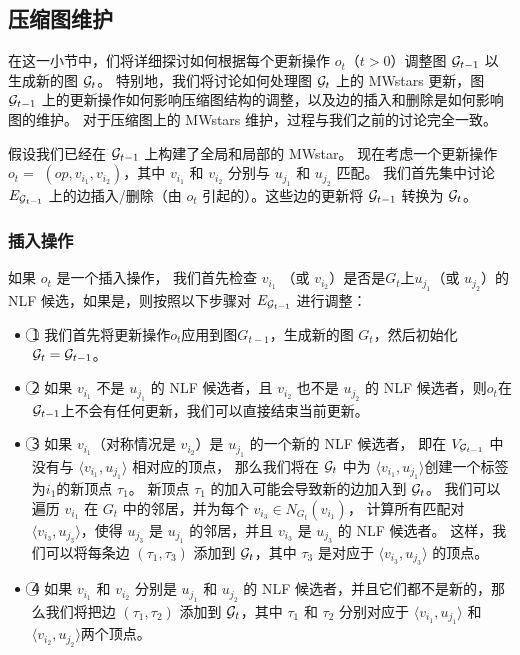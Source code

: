\subsection{压缩图维护}
在这一小节中，们将详细探讨如何根据每个更新操作 $o_t$（$t>0$）调整图 $\mathcal{G}_{t-1}$ 以生成新的图 $\mathcal{G}_t$。
特别地，我们将讨论如何处理图 $\mathcal{G}_t$ 上的 MWstars 更新，图 $\mathcal{G}_{t-1}$ 上的更新操作如何影响压缩图结构的调整，以及边的插入和删除是如何影响图的维护。
对于压缩图上的 MWstars 维护，过程与我们之前的讨论完全一致。

假设我们已经在 $\mathcal{G}_{t-1}$ 上构建了全局和局部的 MWstar。
现在考虑一个更新操作 $o_t=$ $(op, v_{i_1}, v_{i_2})$，其中 $v_{i_1}$ 和 $v_{i_2}$ 分别与 $u_{j_1}$ 和 $u_{j_2}$ 匹配。
%
我们首先集中讨论 $E_{\mathcal{G}_{t-1}}$ 上的边插入/删除（由 $o_t$ 引起的）。这些边的更新将 $\mathcal{G}_{t-1}$ 转换为 $\mathcal{G}_t$。

\subsubsection{插入操作}
如果 $o_t$ 是一个插入操作，
我们首先检查 $v_{i_1}$ （或 $v_{i_2}$）是否是$G_t$上$u_{j_1}$（或 $u_{j_2}$）的 NLF 候选，如果是，则按照以下步骤对 $E_{\mathcal{G}_{t-1}}$ 进行调整：
\begin{itemize}
\item \textcircled{1} 我们首先将更新操作$o_t$应用到图$G_{t-1}$，生成新的图 $G_t$，然后初始化 $\mathcal{G}_t = \mathcal{G}_{t-1}$。
\item \textcircled{2} 如果 $v_{i_1}$ 不是 $u_{j_1}$ 的 NLF 候选者，且 $v_{i_2}$ 也不是 $u_{j_2}$ 的 NLF 候选者，则$o_t$在$\mathcal{G}_{t-1}$上不会有任何更新，我们可以直接结束当前更新。
\item \textcircled{3} 如果 $v_{i_1}$（对称情况是 $v_{i_2}$）是 $u_{j_1}$ 的一个新的 NLF 候选者，
即在 $V_{\mathcal{G}_{t-1}}$ 中没有与 $\langle v_{i_1}, u_{j_1} \rangle$ 相对应的顶点，
那么我们将在 $\mathcal{G}_t$ 中为 $\langle v_{i_1}, u_{j_1} \rangle$创建一个标签为$i_1$的新顶点 $\tau_1$。
新顶点 $\tau_1$ 的加入可能会导致新的边加入到 $\mathcal{G}_t$。
我们可以遍历 $v_{i_1}$ 在 $G_t$ 中的邻居，并为每个 $v_{i_3}\in N_{G_t}(v_{i_1})$，
计算所有匹配对 $\langle v_{i_3}, u_{j_3} \rangle$，使得 $u_{j_3}$ 是 $u_{j_1}$ 的邻居，并且 $v_{i_3}$ 是 $u_{j_3}$ 的 NLF 候选者。
这样，我们可以将每条边 $(\tau_1, \tau_3)$ 添加到 $\mathcal{G}_t$，其中 $\tau_3$ 是对应于 $\langle v_{i_3}, u_{j_3} \rangle$ 的顶点。
\item \textcircled{4} 如果 $v_{i_1}$ 和 $v_{i_2}$ 分别是 $u_{j_1}$ 和 $u_{j_2}$ 的 NLF 候选者，并且它们都不是新的，那么我们将把边 $(\tau_1, \tau_2)$ 添加到 $\mathcal{G}_t$，其中 $\tau_1$ 和 $\tau_2$ 分别对应于 $\langle v_{i_1}, u_{j_1} \rangle$ 和 $\langle v_{i_2}, u_{j_2} \rangle$两个顶点。
\end{itemize}

